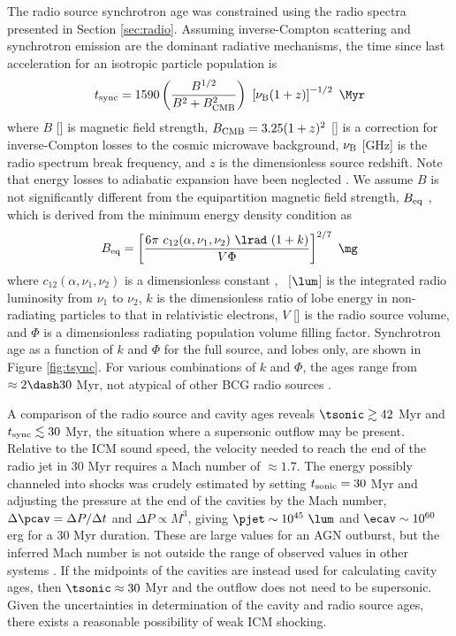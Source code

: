 \documentclass[useAMS,usenatbib]{mn2e}
\begin{document}
The radio source synchrotron age was constrained using the radio
spectra presented in Section \ref{sec:radio}. Assuming inverse-Compton
scattering and synchrotron emission are the dominant radiative
mechanisms, the time since last acceleration for an isotropic particle
population is \citep{2001AJ....122.1172S}
\begin{equation}
  \tsync = 1590 \left(\frac{B^{1/2}}{B^2 + B_{\rm{CMB}}^2}\right)~
  \left[\nu_{\rm{B}} (1+z)\right]^{-1/2} ~\Myr
\end{equation}
where $B$ [\mg] is magnetic field strength, $B_{\rm{CMB}} =
3.25(1+z)^2$ [\mg] is a correction for inverse-Compton losses to the
cosmic microwave background, $\nu_{\rm{B}}$ [GHz] is the radio
spectrum break frequency, and $z$ is the dimensionless source
redshift. Note that energy losses to adiabatic expansion have been
neglected \citep{1968ARA&A...6..321S}. We assume $B$ is not
significantly different from the equipartition magnetic field
strength, $B_{\rm{eq}}$ \citep[see][regarding the validity of this
  assumption]{birzan08}, which is derived from the minimum energy
density condition as \citep{1980ARA&A..18..165M}
\begin{equation}
  B_{\rm{eq}} = \left[\frac{6 \pi ~c_{12}(\alpha,\nu_1, \nu_2)
      ~\lrad ~(1+k)}{V \Phi}\right]^{2/7} ~\rm{\mg}
\end{equation}
where $c_{12}(\alpha,\nu_1,\nu_2)$ is a dimensionless constant
\citep{pach}, \lrad\ [$\lum$] is the integrated radio luminosity from
$\nu_1$ to $\nu_2$, $k$ is the dimensionless ratio of lobe energy in
non-radiating particles to that in relativistic electrons, $V$ [\cc]
is the radio source volume, and $\Phi$ is a dimensionless radiating
population volume filling factor. Synchrotron age as a function of $k$
and $\Phi$ for the full source, and lobes only, are shown in Figure
\ref{fig:tsync}. For various combinations of $k$ and $\Phi$, the ages
range from $\approx 2 \dash 30$ Myr, not atypical of other BCG radio
sources \citep[\eg][]{birzan08}.

A comparison of the radio source and cavity ages reveals $\tsonic \ga
42$ Myr and $t_{\rm{sync}} \lesssim 30$ Myr, the situation where a supersonic
outflow may be present. Relative to the ICM sound speed, the velocity
needed to reach the end of the radio jet in 30 Myr requires a Mach
number of $\approx 1.7$. The energy possibly channeled into shocks was
crudely estimated by setting $t_{\rm{sonic}} = 30$ Myr and adjusting
the pressure at the end of the cavities by the Mach number, $\Delta
\pcav = \Delta P / \Delta t$ and $\Delta P \propto M^3$, giving $\pjet
\sim 10^{45} ~\lum$ and $\ecav \sim 10^{60}$ erg for a 30 Myr
duration. These are large values for an AGN outburst, but the inferred
Mach number is not outside the range of observed values in other
systems \citep[\eg][]{2005ApJ...635..894F, ms0735, hydraa,
  2009MNRAS.395.1999C}. If the midpoints of the cavities are instead
used for calculating cavity ages, then $\tsonic \approx 30$ Myr and
the outflow does not need to be supersonic. Given the uncertainties in
determination of the cavity and radio source ages, there exists a
reasonable possibility of weak ICM shocking.
\end{document}
